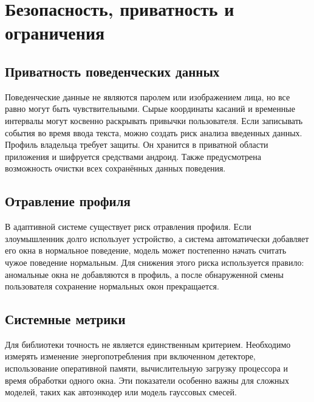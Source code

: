 \documentclass[oneside,senior,etd]{BYUPhys}
\begin{document}
\section{Безопасность, приватность и ограничения}

\subsection{Приватность поведенческих данных}

Поведенческие данные не являются паролем или изображением лица, но все равно могут быть чувствительными. Сырые координаты касаний и временные интервалы могут косвенно раскрывать привычки пользователя. Если записывать события во время ввода текста, можно создать риск анализа введенных данных. Профиль владельца требует защиты. Он хранится в приватной области приложения и шифруется средствами андроид. Также предусмотрена возможность очистки всех сохранённых данных поведения.

\subsection{Отравление профиля}

В адаптивной системе существует риск отравления профиля. Если злоумышленник долго использует устройство, а система автоматически добавляет его окна в нормальное поведение, модель может постепенно начать считать чужое поведение нормальным. Для снижения этого риска используется правило: аномальные окна не добавляются в профиль, а после обнаруженной смены пользователя сохранение нормальных окон прекращается.


\subsection{Системные метрики}

Для библиотеки точность не является единственным критерием. Необходимо измерять изменение энергопотребления при включенном детекторе, использование оперативной памяти, вычислительную загрузку процессора и время обработки одного окна. Эти показатели особенно важны для сложных моделей, таких как автоэнкодер или модель гауссовых смесей.
\end{document}
